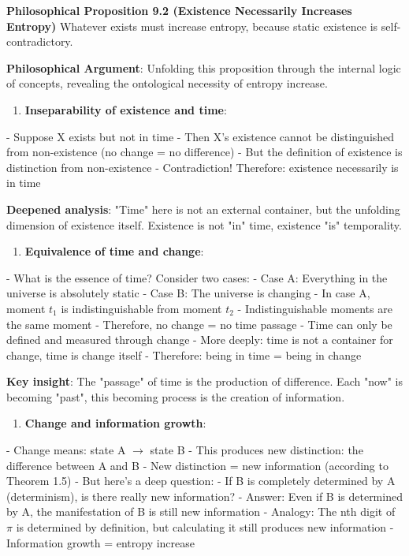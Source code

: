\textbf{Philosophical Proposition 9.2 (Existence Necessarily Increases Entropy)}
Whatever exists must increase entropy, because static existence is self-contradictory.

\textbf{Philosophical Argument}:
Unfolding this proposition through the internal logic of concepts, revealing the ontological necessity of entropy increase.

\begin{enumerate}
\item \textbf{Inseparability of existence and time}:
\end{enumerate}
   - Suppose X exists but not in time
   - Then X's existence cannot be distinguished from non-existence (no change = no difference)
   - But the definition of existence is distinction from non-existence
   - Contradiction! Therefore: existence necessarily is in time
   
   \textbf{Deepened analysis}: "Time" here is not an external container,
   but the unfolding dimension of existence itself.
   Existence is not "in" time, existence "is" temporality.

\begin{enumerate}
\item \textbf{Equivalence of time and change}:
\end{enumerate}
   - What is the essence of time? Consider two cases:
   - Case A: Everything in the universe is absolutely static
   - Case B: The universe is changing
   - In case A, moment $t_1$ is indistinguishable from moment $t_2$
   - Indistinguishable moments are the same moment
   - Therefore, no change = no time passage
   - Time can only be defined and measured through change
   - More deeply: time is not a container for change, time is change itself
   - Therefore: being in time = being in change
   
   \textbf{Key insight}: The "passage" of time is the production of difference.
   Each "now" is becoming "past",
   this becoming process is the creation of information.

\begin{enumerate}
\item \textbf{Change and information growth}:
\end{enumerate}
   - Change means: state A $\rightarrow$ state B
   - This produces new distinction: the difference between A and B
   - New distinction = new information (according to Theorem 1.5)
   - But here's a deep question:
     - If B is completely determined by A (determinism), is there really new information?
     - Answer: Even if B is determined by A, the manifestation of B is still new information
     - Analogy: The nth digit of $\pi$ is determined by definition, but calculating it still produces new information
   - Information growth = entropy increase
   
